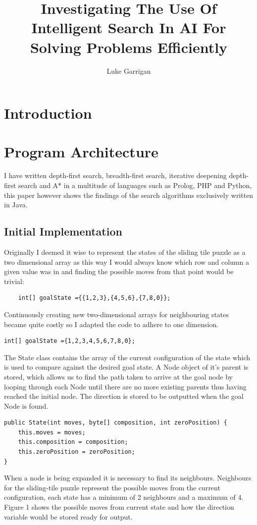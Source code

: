 \documentclass[final]{cmpreport}
\title{Investigating The Use Of Intelligent Search In AI For Solving Problems Efficiently}
\author{Luke Garrigan}
\begin{document}
\section{Introduction}

 
\section{Program Architecture}
I have written depth-first search, breadth-first search, iterative deepening depth-first search and A* in a multitude of languages such as Prolog, PHP and Python, this paper however shows the findings of the search algorithms exclusively written in Java. 
\subsection{Initial Implementation}
Originally I deemed it wise to represent the states of the sliding tile puzzle as a two dimensional array as this way I would always know which row and column a given value was in and finding the possible moves from that point would be trivial:
\begin{verbatim}
	int[] goalState ={{1,2,3},{4,5,6},{7,8,0}};
\end{verbatim}
Continuously creating new two-dimensional arrays for neighbouring states became quite costly so I adapted the code to adhere to one dimension. 
\begin{verbatim}
int[] goalState ={1,2,3,4,5,6,7,8,0};
\end{verbatim}

The State class contains the array of the current configuration of the state which is used to compare against the  desired goal state. A Node object of it's parent is stored, which allows us to find the path taken to arrive at the goal node by looping through each Node until there are no more existing parents thus having reached the initial node. The direction is stored to be outputted when the goal Node is found.     

\begin{verbatim}
public State(int moves, byte[] composition, int zeroPosition) {
    this.moves = moves;
    this.composition = composition;
    this.zeroPosition = zeroPosition;
}

\end{verbatim}
When a node is being expanded it is necessary to find its neighbours. Neighbours for the sliding-tile puzzle represent the possible moves from the current configuration, each state has a minimum of 2 neighbours and a maximum of 4. Figure 1 shows the possible moves from current state and how the direction variable would be stored ready for output. 
\end{document}
